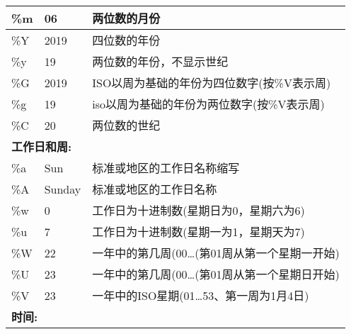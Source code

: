 \begin{itemize}
\begin{longtable}[c]{|lll|}
\multicolumn{1}{|l|}{\%m}            & \multicolumn{1}{l|}{06}                & 两位数的月份                                           \\ \hline
\multicolumn{1}{|l|}{\%Y}            & \multicolumn{1}{l|}{2019}              & 四位数的年份                                           \\ \hline
\multicolumn{1}{|l|}{\%y}            & \multicolumn{1}{l|}{19}                & 两位数的年份，不显示世纪                              \\ \hline
\multicolumn{1}{|l|}{\%G}            & \multicolumn{1}{l|}{2019}              & ISO以周为基础的年份为四位数字(按\%V表示周)      \\ \hline
\multicolumn{1}{|l|}{\%g}            & \multicolumn{1}{l|}{19}                & iso以周为基础的年份为两位数字(按\%V表示周)     \\ \hline
\multicolumn{1}{|l|}{\%C}            & \multicolumn{1}{l|}{20}                & 两位数的世纪                                           \\ \hline
\multicolumn{3}{|l|}{\textbf{工作日和周:}}                                                                                              \\ \hline
\multicolumn{1}{|l|}{\%a}            & \multicolumn{1}{l|}{Sun}               & 标准或地区的工作日名称缩写                  \\ \hline
\multicolumn{1}{|l|}{\%A}            & \multicolumn{1}{l|}{Sunday}            & 标准或地区的工作日名称                               \\ \hline
\multicolumn{1}{|l|}{\%w}            & \multicolumn{1}{l|}{0}                 & 工作日为十进制数(星期日为0，星期六为6)     \\ \hline
\multicolumn{1}{|l|}{\%u}            & \multicolumn{1}{l|}{7}                 & 工作日为十进制数(星期一为1，星期天为7)      \\ \hline
\multicolumn{1}{|l|}{\%W}            & \multicolumn{1}{l|}{22}                & 一年中的第几周(00…(第01周从第一个星期一开始) \\ \hline
\multicolumn{1}{|l|}{\%U}            & \multicolumn{1}{l|}{23}                & 一年中的第几周(00…(第01周从第一个星期日开始)  \\ \hline
\multicolumn{1}{|l|}{\%V}            & \multicolumn{1}{l|}{23}                & 一年中的ISO星期(01…53、第一周为1月4日)         \\ \hline
\multicolumn{3}{|l|}{\textbf{时间:}}                                                                                                           \\ \hline

\end{longtable}
\end{itemize}
